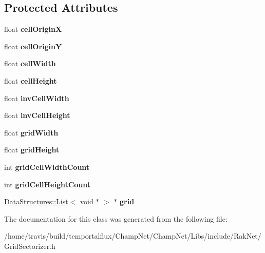 \subsection*{Protected Attributes}
\begin{DoxyCompactItemize}
\item 
\hypertarget{class_grid_sectorizer_a1840788b7be6967667d801c2043cad74}{float {\bfseries cell\-Origin\-X}}\label{class_grid_sectorizer_a1840788b7be6967667d801c2043cad74}

\item 
\hypertarget{class_grid_sectorizer_aeb656d3771f63d5cf11ce897ea640033}{float {\bfseries cell\-Origin\-Y}}\label{class_grid_sectorizer_aeb656d3771f63d5cf11ce897ea640033}

\item 
\hypertarget{class_grid_sectorizer_a65fa004128ea7b6080bb3b21c05e9628}{float {\bfseries cell\-Width}}\label{class_grid_sectorizer_a65fa004128ea7b6080bb3b21c05e9628}

\item 
\hypertarget{class_grid_sectorizer_a86dbf13ff20a9dc9ac0b67ee15b8228d}{float {\bfseries cell\-Height}}\label{class_grid_sectorizer_a86dbf13ff20a9dc9ac0b67ee15b8228d}

\item 
\hypertarget{class_grid_sectorizer_a6fa06ac3f0934d77f71f9709bee393a5}{float {\bfseries inv\-Cell\-Width}}\label{class_grid_sectorizer_a6fa06ac3f0934d77f71f9709bee393a5}

\item 
\hypertarget{class_grid_sectorizer_ae54a1c1acead76fa11802f36c5cb8852}{float {\bfseries inv\-Cell\-Height}}\label{class_grid_sectorizer_ae54a1c1acead76fa11802f36c5cb8852}

\item 
\hypertarget{class_grid_sectorizer_ad05468789aeeaf819a3840e350eb82a0}{float {\bfseries grid\-Width}}\label{class_grid_sectorizer_ad05468789aeeaf819a3840e350eb82a0}

\item 
\hypertarget{class_grid_sectorizer_a40f81a421aac6b512a87470ab7bf155a}{float {\bfseries grid\-Height}}\label{class_grid_sectorizer_a40f81a421aac6b512a87470ab7bf155a}

\item 
\hypertarget{class_grid_sectorizer_a6bd4be175e1f1eedf3b66f630fadb25a}{int {\bfseries grid\-Cell\-Width\-Count}}\label{class_grid_sectorizer_a6bd4be175e1f1eedf3b66f630fadb25a}

\item 
\hypertarget{class_grid_sectorizer_ae485400f386b63cfc84df876258553e9}{int {\bfseries grid\-Cell\-Height\-Count}}\label{class_grid_sectorizer_ae485400f386b63cfc84df876258553e9}

\item 
\hypertarget{class_grid_sectorizer_a6bd909d4303f6d8f1ece14bb578a6852}{\hyperlink{class_data_structures_1_1_list}{Data\-Structures\-::\-List}$<$ void $\ast$ $>$ $\ast$ {\bfseries grid}}\label{class_grid_sectorizer_a6bd909d4303f6d8f1ece14bb578a6852}

\end{DoxyCompactItemize}


The documentation for this class was generated from the following file\-:\begin{DoxyCompactItemize}
\item 
/home/travis/build/temportalflux/\-Champ\-Net/\-Champ\-Net/\-Libs/include/\-Rak\-Net/Grid\-Sectorizer.\-h\end{DoxyCompactItemize}
